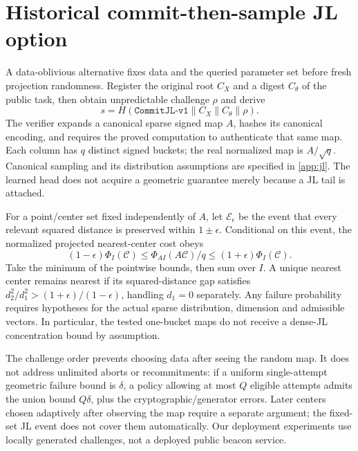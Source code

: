 \section{Historical commit-then-sample JL option}\label{sec:theory}
A data-oblivious alternative fixes data and the queried parameter set before fresh projection randomness. Register the original root $C_X$ and a digest $C_\theta$ of the public task, then obtain unpredictable challenge $\rho$ and derive
\begin{equation}
s=H(\texttt{CommitJL-v1}\|C_X\|C_\theta\|\rho).
\end{equation}
The verifier expands a canonical sparse signed map $A$, hashes its canonical encoding, and requires the proved computation to authenticate that same map. Each column has $q$ distinct signed buckets; the real normalized map is $A/\sqrt q$. Canonical sampling and its distribution assumptions are specified in \ref{app:jl}. The learned head does not acquire a geometric guarantee merely because a JL tail is attached.

For a point/center set fixed independently of $A$, let $\mathcal E_\epsilon$ be the event that every relevant squared distance is preserved within $1\pm\epsilon$. Conditional on this event, the normalized projected nearest-center cost obeys
\begin{equation}
(1-\epsilon)\Phi_I(\mathcal C)\le
\Phi_{AI}(A\mathcal C)/q\le(1+\epsilon)\Phi_I(\mathcal C).
\end{equation}
Take the minimum of the pointwise bounds, then sum over $I$. A unique nearest center remains nearest if its squared-distance gap satisfies $d_2^2/d_1^2>(1+\epsilon)/(1-\epsilon)$, handling $d_1=0$ separately. Any failure probability requires hypotheses for the actual sparse distribution, dimension and admissible vectors. In particular, the tested one-bucket maps do not receive a dense-JL concentration bound by assumption.

The challenge order prevents choosing data after seeing the random map. It does not address unlimited aborts or recommitments: if a uniform single-attempt geometric failure bound is $\delta$, a policy allowing at most $Q$ eligible attempts admits the union bound $Q\delta$, plus the cryptographic/generator errors. Later centers chosen adaptively after observing the map require a separate argument; the fixed-set JL event does not cover them automatically. Our deployment experiments use locally generated challenges, not a deployed public beacon service.
